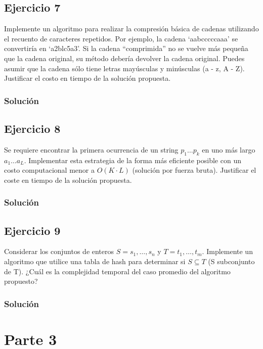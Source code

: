 \documentclass{article}
\begin{document}
\subsection*{Ejercicio 7}
Implemente un algoritmo para realizar la compresión básica de cadenas utilizando el recuento de caracteres repetidos. Por ejemplo, la cadena `aabcccccaaa' se convertiría en `a2blc5a3'. Si la cadena ``comprimida'' no se vuelve más pequeña que la cadena original, su método debería devolver la cadena original. Puedes asumir que la cadena sólo tiene letras mayúsculas y minúsculas (a - z, A - Z). Justificar el costo en tiempo de la solución propuesta.
\subsubsection*{Solución}


\subsection*{Ejercicio 8}
Se requiere encontrar la primera ocurrencia de un string $p_1 \dots p_k$ en uno más largo $a_1 \dots a_L$. Implementar esta estrategia de la forma más eficiente posible con un costo computacional menor a $O(K\cdot L)$ (solución por fuerza bruta). Justificar el coste en tiempo de la solución propuesta.
\subsubsection*{Solución}


\subsection*{Ejercicio 9}
Considerar los conjuntos de enteros $S = {s_1, \dots , s_n}$ y $T = {t_1, \dots , t_m}$. Implemente un algoritmo que utilice una tabla de hash para determinar si $S \subseteq T$ (S subconjunto de T). ¿Cuál es la complejidad temporal del caso promedio del algoritmo propuesto?
\subsubsection*{Solución}


\section*{Parte 3}
\end{document}
